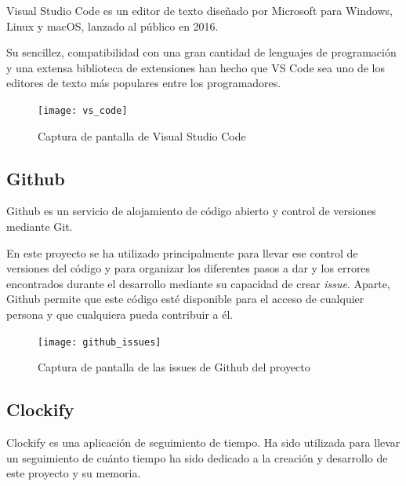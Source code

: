             Visual Studio Code es un editor de texto diseñado por Microsoft para Windows, Linux y macOS, lanzado al
            público en 2016.

            Su sencillez, compatibilidad con una gran cantidad de lenguajes de programación y una extensa biblioteca de
            extensiones han hecho que VS Code sea uno de los editores de texto más populares entre los programadores.
            \cite{wikipedia_vs_code}

            \begin{figure}[ht]
                \centering
                \texttt{[image: vs\_code]}
                \caption{Captura de pantalla de Visual Studio Code \label{fig:VisualStudioCode}}
            \end{figure}
        

        \subsection{Github} %
        \label{sub:Github}

            Github es un servicio de alojamiento de código abierto y control de versiones mediante Git.

            En este proyecto se ha utilizado principalmente para llevar ese control de versiones del código y para
            organizar los diferentes pasos a dar y los errores encontrados durante el desarrollo mediante su capacidad
            de crear \textit{issue}. Aparte, Github permite que este código esté disponible para el acceso de cualquier
            persona y que cualquiera pueda contribuir a él.

            \begin{figure}[ht]
                \centering
                \texttt{[image: github\_issues]}
                \caption{Captura de pantalla de las issues de Github del proyecto \label{fig:GithubIssues}}
            \end{figure}
        

        \subsection{Clockify} %
        \label{sub:Clockify}

            Clockify es una aplicación de seguimiento de tiempo. Ha sido utilizada para llevar un seguimiento de cuánto
            tiempo ha sido dedicado a la creación y desarrollo de este proyecto y su memoria.


